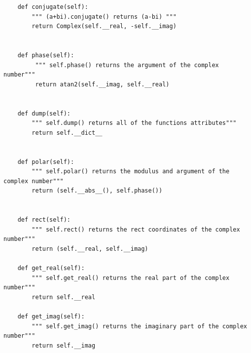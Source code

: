 \documentclass[12pt]{article}
\begin{document}
\begin{lstlisting}
    def conjugate(self):
        """ (a+bi).conjugate() returns (a-bi) """
        return Complex(self.__real, -self.__imag)


    def phase(self):
         """ self.phase() returns the argument of the complex number"""
         return atan2(self.__imag, self.__real)


    def dump(self):
        """ self.dump() returns all of the functions attributes"""
        return self.__dict__


    def polar(self):
        """ self.polar() returns the modulus and argument of the complex number"""
        return (self.__abs__(), self.phase())


    def rect(self):
        """ self.rect() returns the rect coordinates of the complex number"""
        return (self.__real, self.__imag)

    def get_real(self):
        """ self.get_real() returns the real part of the complex number"""
        return self.__real

    def get_imag(self):
        """ self.get_imag() returns the imaginary part of the complex number"""
        return self.__imag
\end{lstlisting}
\end{document}
